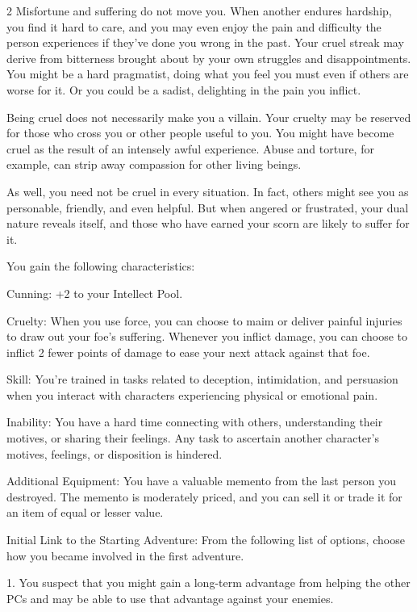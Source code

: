 \begin{multicols}{2}
Misfortune and suffering do not move you. When another endures hardship, you find it hard to care, and you may even enjoy the pain and difficulty the person experiences if they’ve done you wrong in the past. Your cruel streak may derive from bitterness brought about by your own struggles and disappointments. You might be a hard pragmatist, doing what you feel you must even if others are worse for it. Or you could be a sadist, delighting in the pain you inflict.

Being cruel does not necessarily make you a villain. Your cruelty may be reserved for those who cross you or other people useful to you. You might have become cruel as the result of an intensely awful experience. Abuse and torture, for example, can strip away compassion for other living beings.

As well, you need not be cruel in every situation. In fact, others might see you as personable, friendly, and even helpful. But when angered or frustrated, your dual nature reveals itself, and those who have earned your scorn are likely to suffer for it.

You gain the following characteristics:

Cunning: +2 to your Intellect Pool.

Cruelty: When you use force, you can choose to maim or deliver painful injuries to draw out your foe’s suffering. Whenever you inflict damage, you can choose to inflict 2 fewer points of damage to ease your next attack against that foe.

Skill: You’re trained in tasks related to deception, intimidation, and persuasion when you interact with characters experiencing physical or emotional pain.

Inability: You have a hard time connecting with others, understanding their motives, or sharing their feelings. Any task to ascertain another character’s motives, feelings, or disposition is hindered.

Additional Equipment: You have a valuable memento from the last person you destroyed. The memento is moderately priced, and you can sell it or trade it for an item of equal or lesser value.

Initial Link to the Starting Adventure: From the following list of options, choose how you became involved in the first adventure.

1. You suspect that you might gain a long-term advantage from helping the other PCs and may be able to use that advantage against your enemies.


\end{multicols}
